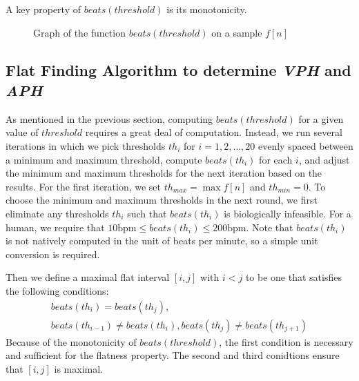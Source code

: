 \documentclass[conference]{IEEEtran}
\newcommand{\APH}{\textit{APH}}
\newcommand{\VPH}{\textit{VPH}}
\begin{document}
A key property of $beats(threshold)$ is its monotonicity. 

\begin{figure}
	\centering
	\caption{Graph of the function $beats(threshold)$ on a sample $f[n]$}
	\label{fig:beats}
\end{figure}

\subsection{Flat Finding Algorithm to determine \VPH{} and \APH{}}
As mentioned in the previous section, computing $beats(threshold)$ for a given value of $threshold$
requires a great deal of
computation. Instead, we run several iterations in which
we pick thresholds $th_i$ for $i = 1, 2, \dots, 20$ evenly spaced
between a minimum and maximum threshold, compute
$beats(th_i)$ for each $i$, and adjust the minimum and
maximum thresholds for the next iteration based on the
results. 
For the first iteration, we set
$th_{max} = \max f[n]$ and $th_{min} = 0$. 
To choose the minimum and maximum thresholds in
the next round, we first eliminate any thresholds $th_i$
such that $beats(th_i)$ is biologically infeasible.
For a human, we require that $10 \text{bpm} \le beats(th_i) \le 200 \text{bpm}$.
Note that $beats(th_i)$ is not natively computed in the unit of beats per minute, so a simple unit conversion is required.

Then we define a maximal flat interval $[i,j]$ with $i<j$ to be one that satisfies the following conditions:
\begin{multline}
	beats(th_i) = beats(th_j),\\ beats(th_{i-1}) \ne beats(th_i), beats(th_j) \ne beats(th_{j+1})
\end{multline}
Because of the monotonicity of $beats(threshold)$, the first condition is necessary and sufficient for the flatness property.
The second and third conidtions ensure that $[i,j]$ is maximal.
\end{document}
